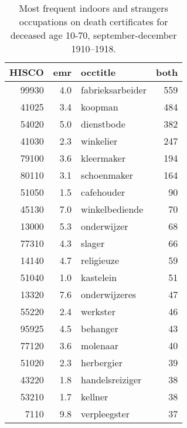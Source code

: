 \begin{table}

\caption{\label{tab:tab:topboth}Most frequent indoors and strangers occupations on death certificates for deceased age 10-70, september-december 1910–1918.}
\centering
\begin{tabular}[t]{r|r|l|r}
\hline
HISCO & emr & occtitle & both\\
\hline
99930 & 4.0 & fabrieksarbeider & 559\\
\hline
41025 & 3.4 & koopman & 484\\
\hline
54020 & 5.0 & dienstbode & 382\\
\hline
41030 & 2.3 & winkelier & 247\\
\hline
79100 & 3.6 & kleermaker & 194\\
\hline
80110 & 3.1 & schoenmaker & 164\\
\hline
51050 & 1.5 & cafehouder & 90\\
\hline
45130 & 7.0 & winkelbediende & 70\\
\hline
13000 & 5.3 & onderwijzer & 68\\
\hline
77310 & 4.3 & slager & 66\\
\hline
14140 & 4.7 & religieuze & 59\\
\hline
51040 & 1.0 & kastelein & 51\\
\hline
13320 & 7.6 & onderwijzeres & 47\\
\hline
55220 & 2.4 & werkster & 46\\
\hline
95925 & 4.5 & behanger & 43\\
\hline
77120 & 3.6 & molenaar & 40\\
\hline
51020 & 2.3 & herbergier & 39\\
\hline
43220 & 1.8 & handelsreiziger & 38\\
\hline
53210 & 1.7 & kellner & 38\\
\hline
7110 & 9.8 & verpleegster & 37\\
\hline
\end{tabular}
\end{table}
